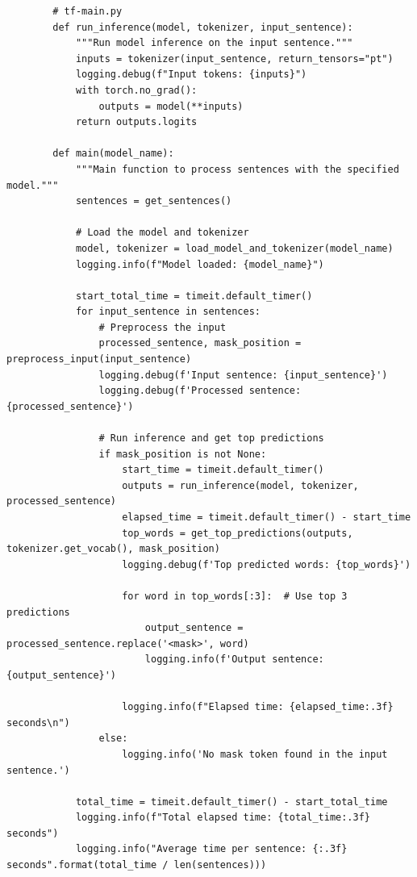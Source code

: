 \begin{listing}
    \begin{verbatim}
        # tf-main.py
        def run_inference(model, tokenizer, input_sentence):
            """Run model inference on the input sentence."""
            inputs = tokenizer(input_sentence, return_tensors="pt")
            logging.debug(f"Input tokens: {inputs}")
            with torch.no_grad():
                outputs = model(**inputs)
            return outputs.logits
        
        def main(model_name):
            """Main function to process sentences with the specified model."""
            sentences = get_sentences()
            
            # Load the model and tokenizer
            model, tokenizer = load_model_and_tokenizer(model_name)
            logging.info(f"Model loaded: {model_name}")
            
            start_total_time = timeit.default_timer()
            for input_sentence in sentences:
                # Preprocess the input
                processed_sentence, mask_position = preprocess_input(input_sentence)
                logging.debug(f'Input sentence: {input_sentence}')
                logging.debug(f'Processed sentence: {processed_sentence}')
                
                # Run inference and get top predictions
                if mask_position is not None:
                    start_time = timeit.default_timer()
                    outputs = run_inference(model, tokenizer, processed_sentence)
                    elapsed_time = timeit.default_timer() - start_time
                    top_words = get_top_predictions(outputs, tokenizer.get_vocab(), mask_position)
                    logging.debug(f'Top predicted words: {top_words}')
                    
                    for word in top_words[:3]:  # Use top 3 predictions
                        output_sentence = processed_sentence.replace('<mask>', word)
                        logging.info(f'Output sentence: {output_sentence}')
                    
                    logging.info(f"Elapsed time: {elapsed_time:.3f} seconds\n")
                else:
                    logging.info('No mask token found in the input sentence.')
            
            total_time = timeit.default_timer() - start_total_time
            logging.info(f"Total elapsed time: {total_time:.3f} seconds")
            logging.info("Average time per sentence: {:.3f} seconds".format(total_time / len(sentences)))
    \end{verbatim}
    \caption[\texttt{tf-main.py} (deel 2)]{Het tweede deel van \texttt{tf-main.py} bevat \texttt{run\_inference}, waarbij elke zin wordt verwerkt met behulp van PyTorch tensors. Dit biedt meer controle over de uitvoer van het model en maakt gedetailleerde \texttt{logging} van voorspellingen en verwerkte zinnen mogelijk. Bovendien gebruiken we nu de functie \texttt{get\_top\_predictions} in combinatie met de softmax-functie om zelf de top voorspellingen te bepalen.}
    \label{lst:low-level-main-part2}
\end{listing}

